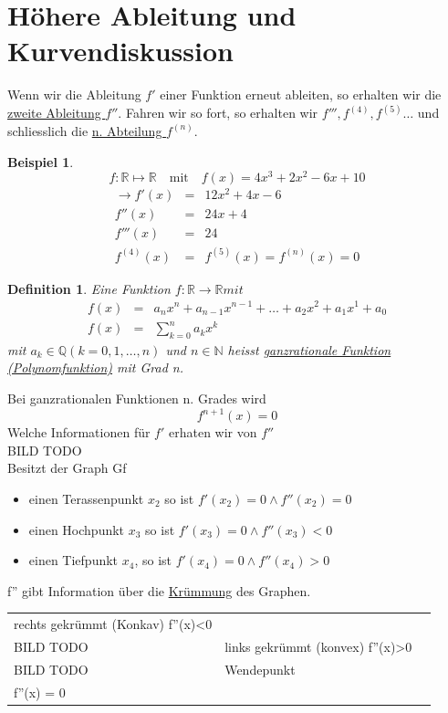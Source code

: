 \documentclass[a4paper,10pt]{report}
\newtheorem{mydef}{Definition}
\newtheorem{myexample}{Beispiel}
\newcommand{\N}{{\mathbb N}}
\newcommand{\Q}{{\mathbb Q}}
\newcommand{\R}{{\mathbb R}}
\begin{document}
\section{Höhere Ableitung und Kurvendiskussion}
Wenn wir die Ableitung $f'$ einer Funktion erneut ableiten, so erhalten wir die \underline{zweite Ableitung $f''$}. Fahren wir so fort, so erhalten wir $f''',f^(4),f^(5)\ldots$ und schliesslich die \underline{n. Abteilung $f^(n)$}.
\begin{myexample}
	\begin{equation*}
		f: \mathbb{R} \mapsto \mathbb{R} \quad \mbox{mit} \quad f(x) = 4x^3+2x^2 -6x+10
	\end{equation*}
	\begin{eqnarray}
		\to f'(x) & = & 12x^2 + 4x -6 \nonumber \\
		f''(x) & = & 24x + 4 \nonumber \\
		f'''(x) & = & 24 \nonumber \\
		f^{(4)}(x) & = & f^{(5)}(x) = f^{(n)}(x) = 0 
	\end{eqnarray}
\end{myexample}
\begin{mydef}
	Eine Funktion $f: \R \to \R mit$
	\begin{eqnarray*}
		f(x) &=& a_nx^n+a_{n-1}x^{n-1}+\ldots + a_2x^2 + a_1x^1+a_0\\
		f(x) &=& \sum_{k=0}^n a_kx^k
	\end{eqnarray*}
	mit $a_k\in \Q (k=0,1,\ldots,n)$ und $n \in \N$ heisst \underline{ganzrationale Funktion (Polynomfunktion)} mit Grad n.
\end{mydef}
\noindent
Bei ganzrationalen Funktionen n. Grades wird 
\begin{equation*} f^{n+1}(x) = 0\end{equation*}
Welche Informationen für $f'$ erhaten wir von $f''$\\
BILD TODO\\
Besitzt der Graph Gf 
\begin{itemize}
\item einen Terassenpunkt $x_2$ so ist $f'(x_2) = 0 \land f''(x_2) = 0$\\
\item einen Hochpunkt $x_3$ so ist $f'(x_3) = 0 \land f''(x_3) < 0$\\
\item einen Tiefpunkt $x_4$, so ist $f'(x_4) = 0 \land f''(x_4) > 0$  
\end{itemize}
f'' gibt Information über die \underline{Krümmung} des Graphen.\\
\begin{tabularx}{\textwidth}{XXX}
	rechts gekrümmt (Konkav) f''(x)<0\\BILD TODO & links gekrümmt (konvex) f''(x)>0 \\BILD TODO & Wendepunkt \\ f''(x) = 0
\end{tabularx}
\end{document}
